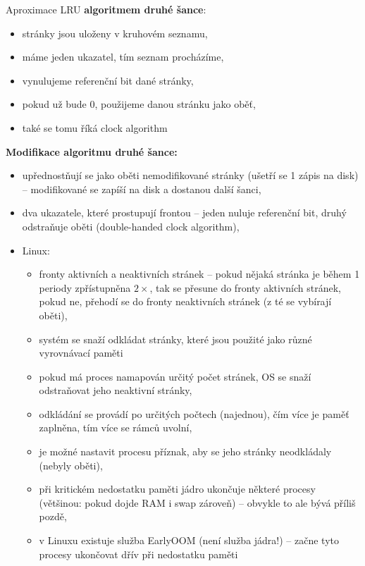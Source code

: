 \documentclass[a4paper, 11pt]{article}
\begin{document}
Aproximace LRU \textbf{algoritmem druhé šance}:
\begin{itemize}
    \item stránky jsou uloženy v kruhovém seznamu,
    \item máme jeden ukazatel, tím seznam procházíme,
    \item vynulujeme referenční bit dané stránky,
    \item pokud už bude 0, použijeme danou stránku jako oběť,
    \item také se tomu říká clock algorithm \\
\end{itemize}
 
\textbf{Modifikace algoritmu druhé šance:}
\begin{itemize}
    \item upřednostňují se jako oběti nemodifikované stránky (ušetří se 1 zápis na disk) -- modifikované se zapíší na disk a dostanou další šanci,
    \item dva ukazatele, které prostupují frontou -- jeden nuluje referenční bit, druhý odstraňuje oběti (double-handed clock algorithm),
    \item Linux:
    \begin{itemize}
        \item fronty aktivních a neaktivních stránek -- pokud nějaká stránka je během 1 periody zpřístupněna $2\times$, tak se přesune do fronty aktivních stránek, pokud ne, přehodí se do fronty neaktivních stránek (z té se vybírají oběti),
    \item systém se snaží odkládat stránky, které jsou použité jako různé vyrovnávací paměti
    \item pokud má proces namapován určitý počet stránek, OS se snaží odstraňovat jeho neaktivní stránky,
    \item odkládání se provádí po určitých počtech (najednou), čím více je paměť zaplněna, tím více se rámců uvolní,
    \item je možné nastavit procesu příznak, aby se jeho stránky neodkládaly (nebyly oběti),
    \item při kritickém nedostatku paměti jádro ukončuje některé procesy (většinou: pokud dojde RAM i swap zároveň) -- obvykle to ale bývá příliš pozdě,
    \item v Linuxu existuje služba EarlyOOM (není služba jádra!) -- začne tyto procesy ukončovat dřív při nedostatku paměti
    \end{itemize}
\end{itemize}
\end{document}
